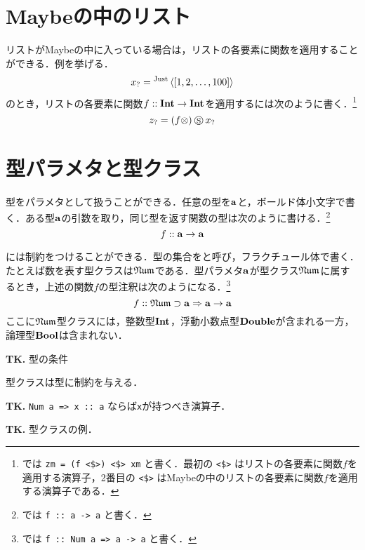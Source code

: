 \documentclass[platex,a5paper,twoside,fleqn,draft]{jsbook}
\newcommand{\keyword}[1]{\textgt{\textbf{#1}}}
\newcommand{\tobewritten}[1]{\begin{screen}\textbf{TK.} {#1}\end{screen}}
\begin{document}
\section{Maybeの中のリスト}

リストがMaybeの中に入っている場合は，リストの各要素に関数を適用することができる．例を挙げる．
\begin{equation}
{x}_?={}^{\text{Just}}\left\langle[1,2,\dots,100]\right\rangle
\end{equation}
のとき，リストの各要素に関数$f::\mathord{\mathbf{Int}}\rightarrow\mathord{\mathbf{Int}}$を適用するには次のように書く．\footnote{\haskell では \verb|zm = (f <$>) <$> xm| と書く．最初の \verb|<$>| はリストの各要素に関数$f$を適用する演算子，2番目の \verb|<$>| はMaybeの中のリストの各要素に関数$f$を適用する演算子である．}
\begin{equation}
{z}_?=(f\otimes)\mathbin{\circledS}{x}_?
\end{equation}

\section{型パラメタと型クラス}

型をパラメタとして扱うことができる．任意の型を$\mathord{\mathbf{a}}$と，ボールド体小文字で書く．ある型$\mathord{\mathbf{a}}$の引数を取り，同じ型を返す関数の型は次のように書ける．\footnote{\haskell では \verb|f :: a -> a| と書く．}
\begin{equation}
f::\mathord{\mathbf{a}}\rightarrow\mathord{\mathbf{a}}
\end{equation}

\keyword{型パラメタ}には制約をつけることができる．型の集合を\keyword{型クラス}と呼び，フラクチュール体で書く．たとえば数を表す型クラスは$\mathfrak{Num}$である．型パラメタ$\mathord{\mathbf{a}}$が型クラス$\mathfrak{Num}$に属するとき，上述の関数$f$の型注釈は次のようになる．\footnote{\haskell では \verb|f :: Num a => a -> a| と書く．}
\begin{equation}
f::
  \mathfrak{Num}\supset\mathord{\mathbf{a}}\Rightarrow\mathord{\mathbf{a}}\rightarrow\mathord{\mathbf{a}}
\end{equation}
ここに$\mathfrak{Num}$型クラスには，整数型$\mathord{\mathbf{Int}}$，浮動小数点型$\mathord{\mathbf{Double}}$が含まれる一方，論理型$\mathord{\mathbf{Bool}}$は含まれない．%

\tobewritten{型の条件}

型クラスは型に制約を与える．

\tobewritten{\texttt{Num a => x :: a} ならば\texttt{x}が持つべき演算子．}

\tobewritten{型クラスの例．}
\end{document}
